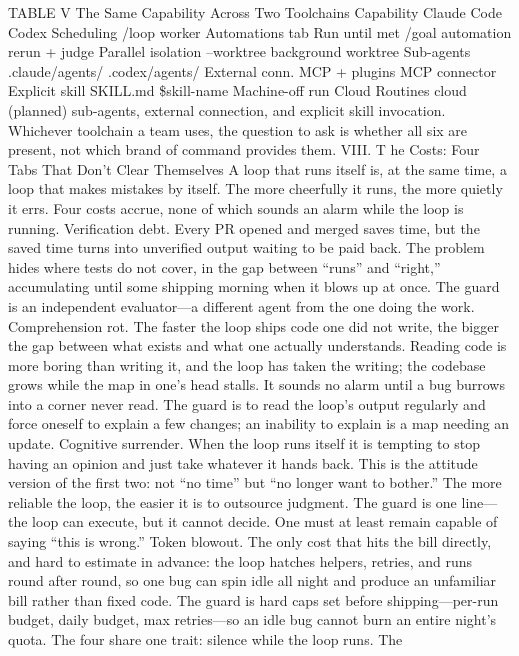 \documentclass[conference]{IEEEtran}
\begin{document}

TABLE V
The Same Capability Across Two Toolchains
Capability Claude Code Codex
Scheduling /loop worker Automations tab
Run until met /goal automation
rerun + judge
Parallel isolation --worktree background
worktree
Sub-agents .claude/agents/ .codex/agents/
External conn. MCP + plugins MCP connector
Explicit skill SKILL.md \$skill-name
Machine-off run Cloud Routines cloud (planned)
sub-agents, external connection, and explicit skill invocation.
Whichever toolchain a team uses, the question to ask is whether
all six are present, not which brand of command provides them.
VIII. T he Costs: Four Tabs That Don’t Clear Themselves
A loop that runs itself is, at the same time, a loop that makes
mistakes by itself. The more cheerfully it runs, the more quietly
it errs. Four costs accrue, none of which sounds an alarm while
the loop is running.
Verification debt. Every PR opened and merged saves time,
but the saved time turns into unverified output waiting to be paid
back. The problem hides where tests do not cover, in the gap
between “runs” and “right,” accumulating until some shipping
morning when it blows up at once. The guard is an independent
evaluator—a different agent from the one doing the work.
Comprehension rot. The faster the loop ships code one did
not write, the bigger the gap between what exists and what one
actually understands. Reading code is more boring than writing
it, and the loop has taken the writing; the codebase grows while
the map in one’s head stalls. It sounds no alarm until a bug
burrows into a corner never read. The guard is to read the loop’s
output regularly and force oneself to explain a few changes; an
inability to explain is a map needing an update.
Cognitive surrender. When the loop runs itself it is tempting
to stop having an opinion and just take whatever it hands back.
This is the attitude version of the first two: not “no time” but “no
longer want to bother.” The more reliable the loop, the easier it
is to outsource judgment. The guard is one line—the loop can
execute, but it cannot decide. One must at least remain capable
of saying “this is wrong.”
Token blowout. The only cost that hits the bill directly, and
hard to estimate in advance: the loop hatches helpers, retries,
and runs round after round, so one bug can spin idle all night
and produce an unfamiliar bill rather than fixed code. The guard
is hard caps set before shipping—per-run budget, daily budget,
max retries—so an idle bug cannot burn an entire night’s quota.
The four share one trait: silence while the loop runs. The
\end{document}
